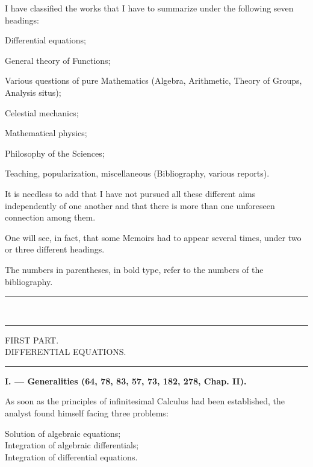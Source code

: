 \documentclass[11pt]{article}
\newcommand{\ornament}{\begin{center}\rule{2.5em}{0.4pt}\,\raisebox{0.1ex}{\tiny$\bullet\bullet\bullet$}\,\rule{2.5em}{0.4pt}\end{center}}
\newcommand{\shortline}{\begin{center}\rule{3.5em}{0.4pt}\end{center}}
\begin{document}
I have classified the works that I have to summarize under the following seven headings:

\begin{description}[leftmargin=3em, itemsep=0pt]
\item[1\textsuperscript{st}] Differential equations;
\item[2\textsuperscript{nd}] General theory of Functions;
\item[3\textsuperscript{rd}] Various questions of pure Mathematics (Algebra, Arithmetic, Theory of Groups, Analysis situs);
\item[4\textsuperscript{th}] Celestial mechanics;
\item[5\textsuperscript{th}] Mathematical physics;
\item[6\textsuperscript{th}] Philosophy of the Sciences;
\item[7\textsuperscript{th}] Teaching, popularization, miscellaneous (Bibliography, various reports).
\end{description}

It is needless to add that I have not pursued all these different aims independently of one another and that there is more than one unforeseen connection among them.

One will see, in fact, that some Memoirs had to appear several times, under two or three different headings.

The numbers in parentheses, in bold type, refer to the numbers of the bibliography.

\ornament

\begin{center}
{\Large FIRST PART.}\\[0.4em]
{\large DIFFERENTIAL EQUATIONS.}
\end{center}
\shortline

\begin{center}
\textbf{I. — Generalities (64, 78, 83, 57, 73, 182, 278, Chap. II).}
\end{center}

As soon as the principles of infinitesimal Calculus had been established, the analyst found himself facing three problems:

\begin{center}
Solution of algebraic equations;\\
Integration of algebraic differentials;\\
Integration of differential equations.
\end{center}
\end{document}
